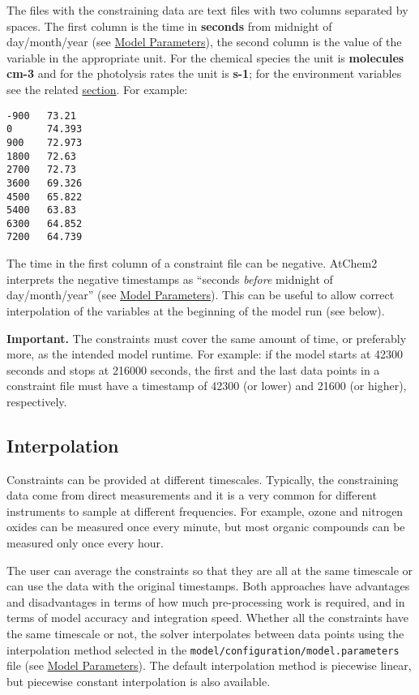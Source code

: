The files with the constraining data are text files with two columns
separated by spaces. The first column is the time in \textbf{seconds}
from midnight of day/month/year (see \hyperref[sec:model-parameters]{Model
  Parameters}), the second column is the value of the variable in the
appropriate unit. For the chemical species the unit is
\textbf{molecules cm-3} and for the photolysis rates the unit is
\textbf{s-1}; for the environment variables see the related
\hyperref[sec:environment-variables]{section}. For example:

\begin{verbatim}
-900   73.21
0      74.393
900    72.973
1800   72.63
2700   72.73
3600   69.326
4500   65.822
5400   63.83
6300   64.852
7200   64.739
\end{verbatim}

The time in the first column of a constraint file can be negative.
AtChem2 interprets the negative timestamps as ``seconds \emph{before}
midnight of day/month/year'' (see \hyperref[sec:model-parameters]{Model
  Parameters}). This can be useful to allow correct interpolation of
the variables at the beginning of the model run (see below).

\textbf{Important.} The constraints must cover the same amount of
time, or preferably more, as the intended model runtime. For example:
if the model starts at 42300 seconds and stops at 216000 seconds, the
first and the last data points in a constraint file must have a
timestamp of 42300 (or lower) and 21600 (or higher), respectively.

\subsection{Interpolation} \label{subsec:interpolation}

Constraints can be provided at different timescales. Typically, the
constraining data come from direct measurements and it is a very
common for different instruments to sample at different
frequencies. For example, ozone and nitrogen oxides can be measured
once every minute, but most organic compounds can be measured only
once every hour.

The user can average the constraints so that they are all at the same
timescale or can use the data with the original timestamps. Both
approaches have advantages and disadvantages in terms of how much
pre-processing work is required, and in terms of model accuracy and
integration speed. Whether all the constraints have the same timescale
or not, the solver interpolates between data points using the
interpolation method selected in the
\texttt{model/configuration/model.parameters} file (see
\hyperref[sec:model-parameters]{Model Parameters}). The default
interpolation method is piecewise linear, but piecewise constant
interpolation is also available.

